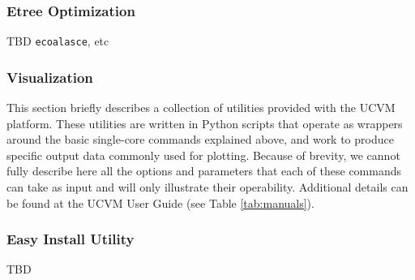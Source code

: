 \subsubsection{Etree Optimization}

TBD \texttt{ecoalasce}, etc

\subsubsection{Visualization}



This section briefly describes a collection of utilities provided with the UCVM platform. These utilities are written in Python scripts that operate as wrappers around the basic single-core commands explained above, and work to produce specific output data commonly used for plotting. Because of brevity, we cannot fully describe here all the options and parameters that each of these commands can take as input and will only illustrate their operability. Additional details can be found at the UCVM User Guide (see Table \ref{tab:manuals}).

\subsubsection{Easy Install Utility}

TBD
